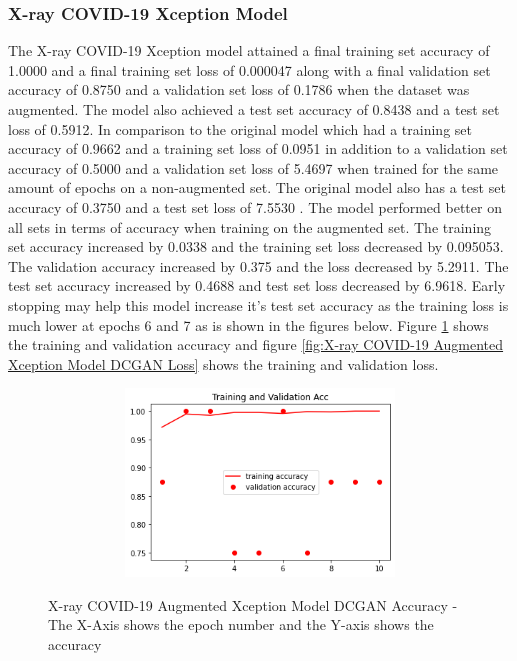 \subsubsection{X-ray COVID-19 Xception Model}
The X-ray COVID-19 Xception model attained a final training set accuracy of 1.0000 and a final training set loss of 0.000047 along with a final validation set accuracy of 0.8750 and a validation set loss of 0.1786 when the dataset was augmented.  The model also achieved a test set accuracy of 0.8438 and a test set loss of 0.5912.  In comparison to the original model which had a training set accuracy of 0.9662 and a training set loss of 0.0951 in addition to a validation set accuracy of 0.5000 and a validation set loss of 5.4697 when trained for the same amount of epochs on a non-augmented set.  The original model also has a test set accuracy of 0.3750 and a test set loss of 7.5530 .  The model performed better on all sets in terms of accuracy when training on the augmented set.  The training set accuracy increased by 0.0338 and the training set loss decreased by 0.095053. The validation accuracy increased by 0.375 and the loss decreased by 5.2911.  The test set accuracy increased by 0.4688 and test set loss decreased by 6.9618.  Early stopping may help this model increase it's test set accuracy as the training loss is much lower at epochs 6 and 7 as is shown in the figures below.  Figure \ref{fig:X-ray COVID-19 Augmented Xception Model DCGAN Accuracy} shows the training and validation accuracy and figure \ref{fig:X-ray COVID-19 Augmented Xception Model DCGAN Loss} shows the training and validation loss.
 \begin{figure}[H]
    \centering    \includegraphics[width=1\textwidth,height=5cm,keepaspectratio]{Images/XceptionBaselineTrainingValidationAccuracyXRayCOVID19AugmentedDCGAN.png}\\
    \caption{X-ray COVID-19 Augmented Xception Model DCGAN Accuracy - The X-Axis shows the epoch number and the Y-axis shows the accuracy}
    \label{fig:X-ray COVID-19 Augmented Xception Model DCGAN Accuracy}
\end{figure}
